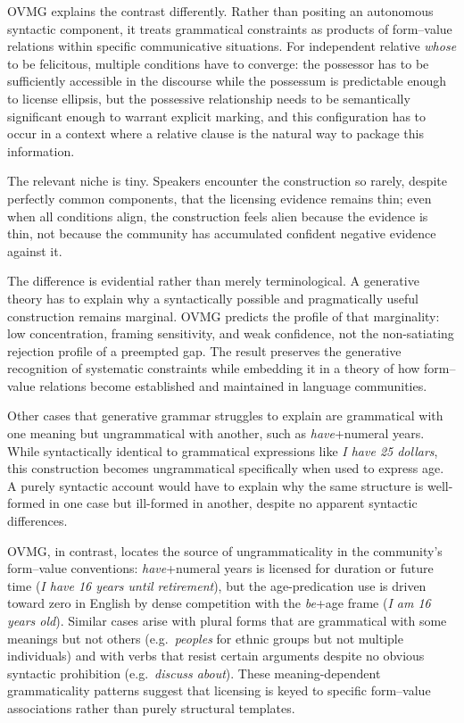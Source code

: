 \documentclass[12pt,letterpaper]{article}
\newcommand{\mention}[1]{\textit{#1}}
\begin{document}
OVMG explains the contrast differently. Rather than positing an autonomous
syntactic component, it treats grammatical constraints as products of form--value
relations within specific communicative situations. For independent relative
\mention{whose} to be felicitous, multiple conditions have to converge: the
possessor has to be sufficiently accessible in the discourse while
the possessum is predictable enough to license ellipsis, but the possessive
relationship needs to be semantically significant enough to warrant explicit
marking, and this configuration has to occur in a context where a relative clause
is the natural way to package this information.

The relevant niche is tiny. Speakers encounter the construction so rarely,
despite perfectly common components, that the licensing evidence remains thin;
even when all
conditions align, the construction feels alien because the evidence is thin, not
because the community has accumulated confident negative evidence against it.

The difference is evidential rather than merely terminological. A generative
theory has to explain why a syntactically possible and pragmatically useful
construction remains marginal. OVMG predicts the profile of that marginality:
low concentration, framing sensitivity, and weak confidence, not the
non-satiating rejection profile of a preempted gap. The result preserves the
generative recognition of systematic constraints while embedding it in a theory
of how form--value relations become established and maintained in language
communities.

Other cases that generative grammar struggles to explain are grammatical with
one meaning but ungrammatical with another, such as \mention{have}+numeral
years. While syntactically identical to grammatical expressions like
\mention{I have 25 dollars}, this construction becomes ungrammatical
specifically when used to express age. A purely syntactic account would have to
explain why the same structure is well-formed in one case but ill-formed in
another, despite no apparent syntactic differences.

OVMG, in contrast, locates the source of ungrammaticality in the community's
form--value conventions: \mention{have}+numeral years is licensed for duration
or future time (\mention{I have 16 years until retirement}), but the
age-predication use is driven toward zero in English by dense competition with
the \mention{be}+age frame (\mention{I am 16 years old}). Similar cases arise
with plural forms that are grammatical with some meanings but not others
(e.g.\, \mention{peoples} for ethnic groups but not multiple individuals) and
with verbs that resist certain arguments despite no obvious syntactic
prohibition (e.g.\, \mention{discuss about}). These meaning-dependent
grammaticality patterns suggest that licensing is keyed to specific form--value
associations rather than purely structural templates.
\end{document}
